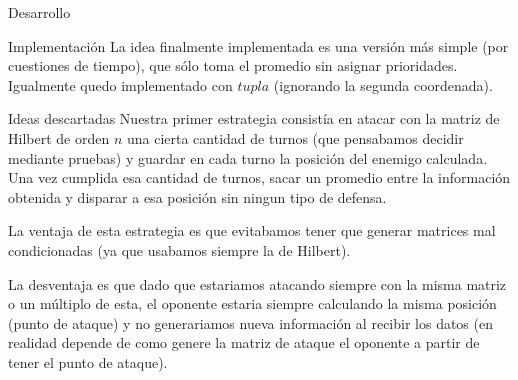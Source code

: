 \begin{section}{Desarrollo}
\begin{subsection}{Implementación}
		La idea finalmente implementada es una versión más simple (por cuestiones de tiempo), que sólo toma el promedio sin asignar prioridades. Igualmente quedo implementado con $tupla$ (ignorando la segunda coordenada).
	\end{subsection}
	\begin{subsection}{Ideas descartadas}
		Nuestra primer estrategia consistía en atacar con la matriz de Hilbert de orden $n$ una cierta cantidad de turnos (que pensabamos decidir mediante pruebas) y guardar en cada turno la posición del enemigo calculada. Una vez cumplida esa cantidad de turnos, sacar un promedio entre la información obtenida y disparar a esa posición sin ningun tipo de defensa.
		
		La ventaja de esta estrategia es que evitabamos tener que generar matrices mal condicionadas (ya que usabamos siempre la de Hilbert).
		
		La desventaja es que dado que estariamos atacando siempre con la misma matriz o un múltiplo de esta, el oponente estaria siempre calculando la misma posición (punto de ataque) y no generariamos nueva información al recibir los datos (en realidad depende de como genere la matriz de ataque el oponente a partir de tener el punto de ataque).
	\end{subsection}
\end{section}